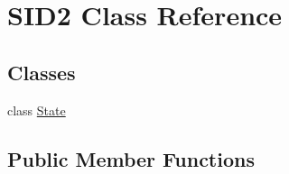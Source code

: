 \hypertarget{classSID2}{\section{S\-I\-D2 Class Reference}
\label{classSID2}
}
\subsection*{Classes}
\begin{DoxyCompactItemize}
\item 
class \hyperlink{classSID2_1_1State}{State}
\end{DoxyCompactItemize}
\subsection*{Public Member Functions}
